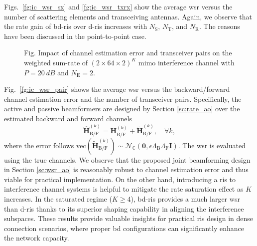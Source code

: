 \documentclass[
	fontsize=11pt,
	paper=a4,
	foldmarks=false
]{scrartcl}
\begin{document}
\begin{reviewer}
{{			Figs.~\ref{fg:ic_wsr_sx} and \ref{fg:ic_wsr_txrx} show the average \gls{wsr} versus the number of scattering elements and transceiving antennas.
			Again, we observe that the rate gain of \gls{bd}-\gls{ris} over \gls{d}-\gls{ris} increases with $N_\mathrm{S}$, $N_\mathrm{T}$, and $N_\mathrm{R}$.
			The reasons have been discussed in the point-to-point case.

			\begin{figure}[H]
				\centering
				\resizebox{!}{5cm}{
					
				}
				\caption*{
					Fig. Impact of channel estimation error and transceiver pairs on the weighted sum-rate of $(2 \times 64 \times 2)^K$ \gls{mimo} interference channel with $P = \qty{20}{dB}$ and $N_\mathrm{E} = 2$.
				}
			\end{figure}

			Fig.~\ref{fg:ic_wsr_pair} shows the average \gls{wsr} versus the backward/forward channel estimation error and the number of transceiver pairs.
			Specifically, the active and passive beamformers are designed by Section \ref{sc:rate_ao} over the estimated backward and forward channels
			\begin{equation*}
				\hat{\mathbf{H}}_{\mathrm{B/F}}^{(k)} = \mathbf{H}_{\mathrm{B/F}}^{(k)} + \tilde{\mathbf{H}}_{\mathrm{B/F}}^{(k)}, \quad \forall k,
			\end{equation*}
			where the error follows $\mathrm{vec}(\tilde{\mathbf{H}}_{\mathrm{B/F}}^{(k)}) \sim \mathcal{N}_\mathbb{C}(\mathbf{0}, \epsilon \Lambda_\mathrm{B} \Lambda_\mathrm{F}\mathbf{I})$.
			The \gls{wsr} is evaluated using the true channels.
			We observe that the proposed joint beamforming design in Section \ref{sc:wsr_ao} is reasonably robust to channel estimation error and thus viable for practical implementation.
			On the other hand, introducing a \gls{ris} to interference channel systems is helpful to mitigate the rate saturation effect as $K$ increases.
			In the saturated regime ($K \ge 4$), \gls{bd}-\gls{ris} provides a much larger \gls{wsr} than \gls{d}-\gls{ris} thanks to its superior shaping capability in aligning the interference subspaces.
			These results provide valuable insights for practical \gls{ris} design in dense connection scenarios, where proper \gls{bd} configurations can significantly enhance the network capacity.
		}
	}



\end{reviewer}
\end{document}
